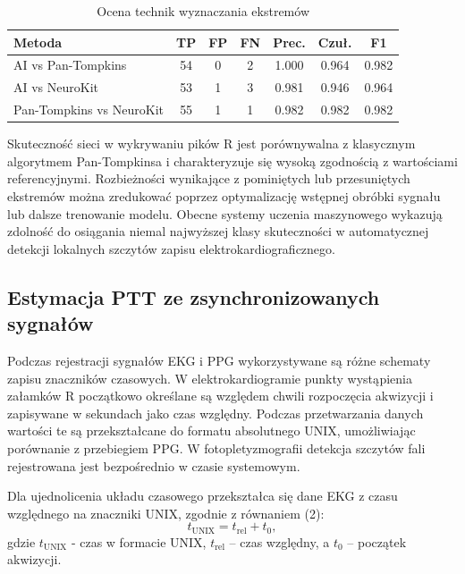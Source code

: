 \documentclass[journal]{IEEEtran}
\begin{document}
\begin{table}[ht]
\caption{Ocena technik wyznaczania ekstremów}
\label{tab:peak_comparison}
\centering
\begin{tabular}{|p{3.08cm}|c|c|c|c|c|c|}
\hline
\textbf{Metoda} & \textbf{TP} & \textbf{FP} & \textbf{FN} & \textbf{Prec.} & \textbf{Czuł.} & \textbf{F1} \\
\hline
AI vs Pan-Tompkins & 54 & 0 & 2 & 1.000 & 0.964 & 0.982 \\
AI vs NeuroKit & 53 & 1 & 3 & 0.981 & 0.946 & 0.964 \\
Pan-Tompkins vs NeuroKit & 55 & 1 & 1 & 0.982 & 0.982 & 0.982 \\
\hline
\end{tabular}
\end{table}

\newpage
Skuteczność sieci w wykrywaniu pików R jest porównywalna z klasycznym algorytmem Pan-Tompkinsa i charakteryzuje się wysoką zgodnością z wartościami referencyjnymi. Rozbieżności wynikające z pominiętych lub przesuniętych ekstremów można zredukować poprzez optymalizację wstępnej obróbki sygnału lub dalsze trenowanie modelu. Obecne systemy uczenia maszynowego wykazują zdolność do osiągania niemal najwyższej klasy skuteczności w automatycznej detekcji lokalnych szczytów zapisu elektrokardiograficznego.

\newpage
\subsection{Estymacja PTT ze zsynchronizowanych sygnałów}
Podczas rejestracji sygnałów EKG i PPG wykorzystywane są różne schematy zapisu znaczników czasowych. W elektrokardiogramie punkty wystąpienia załamków R początkowo określane są względem chwili rozpoczęcia akwizycji i zapisywane w sekundach jako czas względny. Podczas przetwarzania danych wartości te są przekształcane do formatu absolutnego UNIX, umożliwiając porównanie z przebiegiem PPG. W fotopletyzmografii detekcja szczytów fali rejestrowana jest bezpośrednio w czasie systemowym.

Dla ujednolicenia układu czasowego przekształca się dane EKG z czasu względnego na znaczniki UNIX, zgodnie z równaniem (2):
\begin{equation}
t_{\mathrm{UNIX}} = t_{\mathrm{rel}} + t_{0},
\end{equation}
gdzie $t_{\mathrm{UNIX}}$ - czas w formacie UNIX, $t_{\mathrm{rel}}$ – czas względny, a $t_{0}$ – początek akwizycji.
\end{document}
